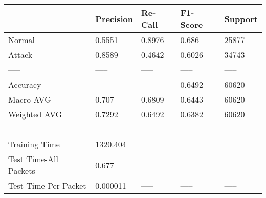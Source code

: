 \begin{tabular}{lllll}
\toprule
{} & Precision & Re-Call & F1-Score & Support \\
\midrule
Normal                &    0.5551 &  0.8976 &    0.686 &   25877 \\
Attack                &    0.8589 &  0.4642 &   0.6026 &   34743 \\
-----                 &     ----- &   ----- &    ----- &   ----- \\
Accuracy              &           &         &   0.6492 &   60620 \\
Macro AVG             &     0.707 &  0.6809 &   0.6443 &   60620 \\
Weighted AVG          &    0.7292 &  0.6492 &   0.6382 &   60620 \\
-----                 &     ----- &   ----- &    ----- &   ----- \\
Training Time         &  1320.404 &   ----- &    ----- &   ----- \\
Test Time-All Packets &     0.677 &   ----- &    ----- &   ----- \\
Test Time-Per Packet  &  0.000011 &   ----- &    ----- &   ----- \\
\bottomrule
\end{tabular}
